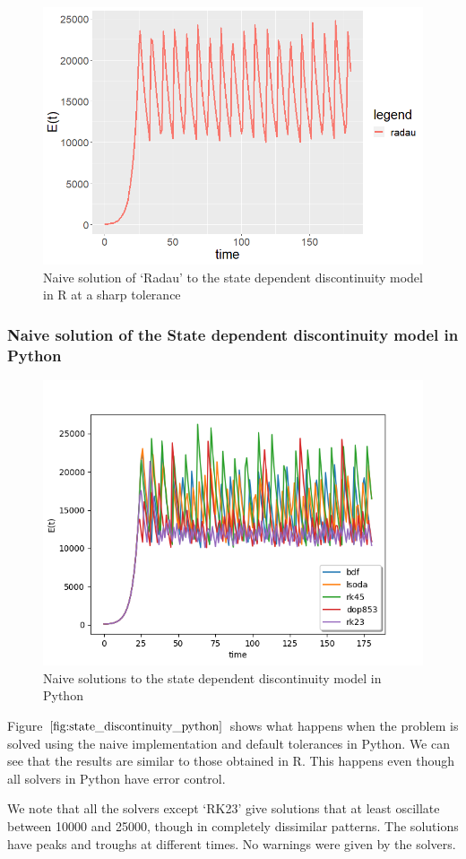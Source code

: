 \begin{figure}[H]
\centering
\includegraphics[width=0.7\linewidth]{./figures/state_discontinuity_sharp_radau_R}
\caption{Naive solution of `Radau' to the state dependent discontinuity model in R at a sharp tolerance}
\label{fig:state_discontinuity_radau_sharp_R}
\end{figure}

\subsubsection{Naive solution of the State dependent discontinuity model in Python}
\begin{figure}[H]
\centering
\includegraphics[width=0.7\linewidth]{./figures/state_discontinuity_py}
\caption{Naive solutions to the state dependent discontinuity model in Python}
\label{fig:state_discontinuity_python}
\end{figure}
Figure $\ref{fig:state_discontinuity_python}$ shows what happens when the problem is solved using the naive implementation and default tolerances in Python. We can see that the results are similar to those obtained in R. This happens even though all solvers in Python have error control.

We note that all the solvers except `RK23' give solutions that at least oscillate between 10000 and 25000, though in completely dissimilar patterns. The solutions have peaks and troughs at different times. No warnings were given by the solvers.

